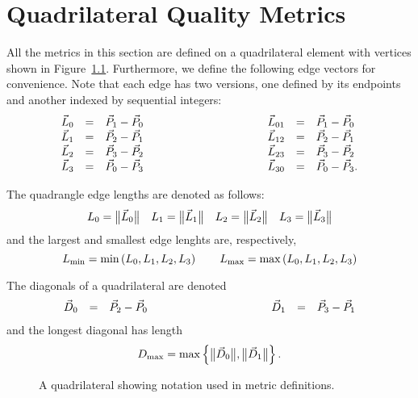 \chapter{Quadrilateral Quality Metrics}

All the metrics in this section are defined on a quadrilateral element with vertices
shown in Figure~\ref{f:quad}. Furthermore, we define the following edge vectors for
convenience. Note that each edge has two versions, one defined by its endpoints and
another indexed by sequential integers:
\begin{equation*}
\begin{array}{lcl}
\vec L_0 &=& \vec P_1 - \vec P_0\\
\vec L_1 &=& \vec P_2 - \vec P_1\\
\vec L_2 &=& \vec P_3 - \vec P_2\\
\vec L_3 &=& \vec P_0 - \vec P_3
\end{array}\rule{10em}{0pt}
\begin{array}{lcl}
\vec L_{01} &=& \vec P_1 - \vec P_0\\
\vec L_{12} &=& \vec P_2 - \vec P_1\\
\vec L_{23} &=& \vec P_3 - \vec P_2\\
\vec L_{30} &=& \vec P_0 - \vec P_3.
\end{array}
\end{equation*}

The quadrangle edge lengths are denoted as follows:
\[
L_0 = \big\lVert{\vec L_0}\big\rVert\quad
L_1 = \big\lVert{\vec L_1}\big\rVert\quad
L_2 = \big\lVert{\vec L_2}\big\rVert\quad
L_3 = \big\lVert{\vec L_3}\big\rVert
\]
and the largest and smallest edge lenghts are, respectively,
\[
L_{\min} = \min\left(L_0, L_1, L_2, L_3\right)
  \rule{2em}{0pt}
L_{\max} = \max\left(L_0, L_1, L_2, L_3\right)
\]

The diagonals of a quadrilateral are denoted
\begin{equation*}
\begin{array}{lcl}
\vec D_0 &=& \vec P_2 - \vec P_0
\end{array}\rule{10em}{0pt}
\begin{array}{lcl}
\vec D_1 &=& \vec P_3 - \vec P_1
\end{array}
\end{equation*}
and the longest diagonal has length
\[
D_{\max} = \max\left\{ \big\lVert{\vec D_0}\big\rVert, \big\lVert{\vec D_1}\big\rVert \right\}.
\]

\begin{figure}[htb]
  \centering
  \caption{A quadrilateral showing notation used in metric definitions.%
                                                                  \label{f:quad}}
\end{figure}

